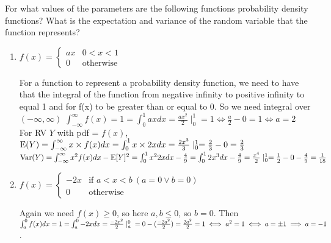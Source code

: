 \question For what values of the parameters are the following functions 
probability density functions? What is the expectation and variance of 
the random variable that the function represents?
\begin{enumerate}[label=(\alph*)]
    \item $f(x) = \begin{cases} ax & 0 < x < 1 \\ 0 & \text{otherwise} 
    \end{cases}$
 	\begin{solution}[1.2cm]
For a function to represent a probability density function, we need to 
have that the integral of the function from negative infinity to positive 
infinity to equal 1 and for f(x) to be greater than or equal to 0. So 
we need integral over $(-\infty, \infty)$ $ \int_{-\infty}^\infty f(x) = 1 
= \int_{0}^{1} ax dx = \frac{ax^2}{2} \mid_{0}^{1} = 1 \iff  \frac{a}{2} - 
0 = 1 \iff a = 2$ \\
For RV $Y$ with pdf = $f(x)$, 
$\text{E}(Y) = \int_{-\infty}^{\infty} x \times f(x) dx = \int_{0}^{1} x \times 
2x dx = \frac{2x^3}{3} \mid_{0}^{1} = \frac{2}{3} - 0 = \frac{2}{3}$ \\
$\text{Var}(Y) = \int_{-\infty}^{\infty} x^2 f(x) dx - \text{E}[Y]^2 = 
\int_{0}^{1} x^2 2x dx - \frac{4}{9}= \int_{0}^{1} 2x^3 dx - 
\frac{4}{9}= \frac{x^4}{2} \mid_{0}^{1} = \frac{1}{2} - 0 -\frac{4}{9} 
= \frac{1}{18}$
	\end{solution}
    
\item $f(x) = \begin{cases} -2x & \text{if } a < x < b\ (a = 0 \lor b 
= 0)\\ 0 & \text{otherwise} \end{cases}$
\begin{solution}[1.2cm]
Again we need $f(x) \ge 0$, so here $a, b \le 0$, so $b=0$.
        Then 
$\int_{a}^{0} f(x) dx = 1 = \int_{a}^{0} -2x dx = \frac{-2x^2}{2} \mid_{a}^{0}  \\
= 0 - (\frac{-2a^2}{2}) = \frac{2a^2}{2} = 1 \iff a^2 = 1 \iff a \\
= \pm 1 \implies a = -1$. \\
\end{solution}


\end{enumerate}
